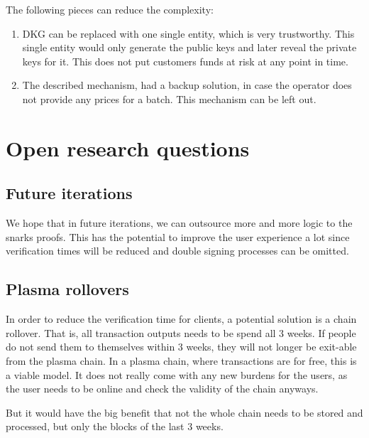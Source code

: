 \documentclass[11pt,parskip=full]{scrartcl}%
\begin{document}
The following pieces can reduce the complexity:
\begin{enumerate}
\item
DKG can be replaced with one single entity, which is very trustworthy. 
This single entity would only generate the public keys and later reveal the private keys for it. 
This does not put customers funds at risk at any point in time. 
\item
The described mechanism, had a backup solution, in case the operator does not provide any prices for a batch. 
This mechanism can be left out.
\end{enumerate}

\section{Open research questions}

\subsection{Future iterations}
We hope that in future iterations, we can outsource more and more logic to the snarks proofs. 
This has the potential to improve the user experience a lot since verification times will be reduced and double signing processes can be omitted. 

\subsection{Plasma rollovers}
In order to reduce the verification time for clients, a potential solution is a chain rollover. 
That is, all transaction outputs needs to be spend all 3 weeks. 
If people do not send them to themselves within 3 weeks, they will not longer be exit-able from the plasma chain. 
In a plasma chain, where transactions are for free, this is a viable model. 
It does not really come with any new burdens for the users, as the user needs to be online and check the validity of the chain anyways.

But it would have the big benefit that not the whole chain needs to be stored and processed, but only the blocks of the last 3 weeks. 
\end{document}
